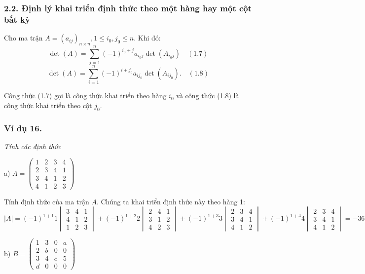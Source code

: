 \subsubsection*{2.2. Định lý khai triển định thức theo một hàng hay một cột bất kỳ}
Cho ma trận \( A = (a_{ij})_{n \times n}, 1 \le i_0, j_0 \le n \). Khi đó:
\[
\det(A) = \sum_{j=1}^n (-1)^{i_0 + j}a_{i_0 j} \det(A_{i_0 j}) \quad (1.7)
\]
\[
\det(A) = \sum_{i=1}^n (-1)^{i+j_0} a_{i j_0} \det(A_{i j_0}). \quad (1.8)
\]

Công thức (1.7) gọi là công thức khai triển theo hàng \(i_0\) và công thức (1.8) là công thức khai triển theo cột \(j_0\).

\subsubsection*{Ví dụ 16.}
\textit{Tính các định thức}

a) \( A = \begin{pmatrix}
1 & 2 & 3 & 4 \\
2 & 3 & 4 & 1 \\
3 & 4 & 1 & 2 \\
4 & 1 & 2 & 3
\end{pmatrix} \)

Tính định thức của ma trận \(A\). Chúng ta khai triển định thức này theo hàng 1:
\[
|A| = (-1)^{1+1} 1 \begin{vmatrix}
3 & 4 & 1 \\
4 & 1 & 2 \\
1 & 2 & 3
\end{vmatrix}
+ (-1)^{1+2} 2 \begin{vmatrix}
2 & 4 & 1 \\
3 & 1 & 2 \\
4 & 2 & 3
\end{vmatrix}
+ (-1)^{1+3} 3 \begin{vmatrix}
2 & 3 & 4 \\
3 & 4 & 1 \\
4 & 1 & 2
\end{vmatrix}
+ (-1)^{1+4} 4 \begin{vmatrix}
2 & 3 & 4 \\
3 & 4 & 1 \\
4 & 1 & 2
\end{vmatrix}
= -36 + 8 + 12 + 176 = 160.
\]

b) \( B = \begin{pmatrix}
1 & 3 & 0 & a \\
2 & b & 0 & 0 \\
3 & 4 & c & 5 \\
d & 0 & 0 & 0
\end{pmatrix} \)

